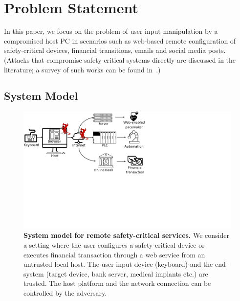 \section{Problem Statement}
\label{sec:problemStatement_IK}

In this paper, we focus on the problem of user input manipulation by a compromised host PC in scenarios such as web-based remote configuration of safety-critical devices, financial transitions, emails and social media posts. (Attacks that compromise safety-critical systems directly are discussed in the literature; a survey of such works can be found in~\cite{fachkha2017internet}.)



\subsection{System Model}

\begin{figure}[t]
    \centering
    \includegraphics[trim={0 8cm 14cm 0},clip,width=0.8\linewidth]{chapters/IntegriKey/images/Motivation_revised_5.pdf}
    \caption[System model for remote safety-critical services]{\textbf{System model for remote safety-critical services.} We consider a setting where the user configures a safety-critical device or executes financial transaction through a web service from an untrusted local host. The user input device (keyboard) and the end-system (target device, bank server, medical implants etc.) are trusted. The host platform and the network connection can be controlled by the adversary.} 

    \label{fig:systemModel}
\end{figure}

